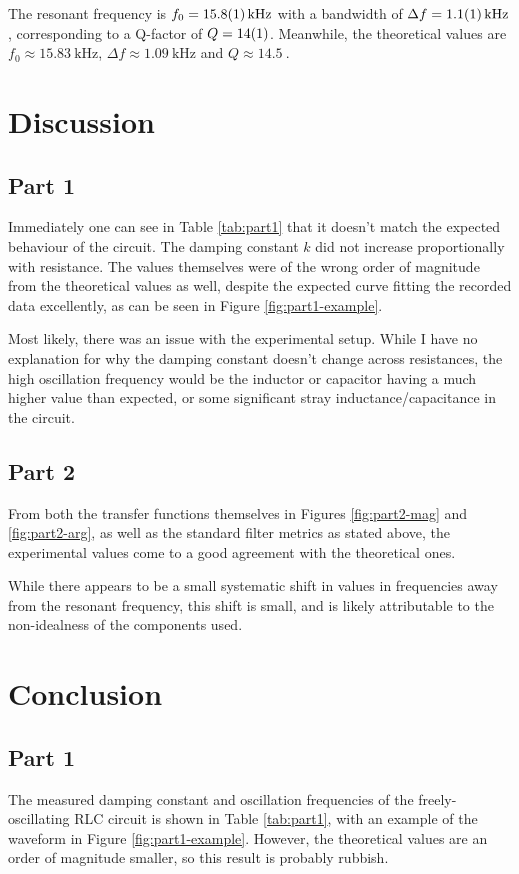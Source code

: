 \documentclass[a4paper]{scrartcl}
\begin{document}
The resonant frequency is \(f_0 = \SI{15.8 \pm 0.1}{\kilo\hertz}\) with a bandwidth of \(\Delta f = \SI{1.1 \pm 0.1}{\kilo\hertz}\), corresponding to a Q-factor of \(Q = \SI{14 \pm 1}{}\). Meanwhile, the theoretical values are \(f_0 \approx \SI{15.83}{\kilo\hertz}\), \(\Delta f \approx \SI{1.09}{\kilo\hertz}\) and \(Q \approx \SI{14.5}{}\).

\section{Discussion}
\subsection{Part 1}
Immediately one can see in Table \ref{tab:part1} that it doesn't match the expected behaviour of the circuit. The damping constant \(k\) did not increase proportionally with resistance. The values themselves were of the wrong order of magnitude from the theoretical values as well, despite the expected curve fitting the recorded data excellently, as can be seen in Figure \ref{fig:part1-example}.

Most likely, there was an issue with the experimental setup. While I have no explanation for why the damping constant doesn't change across resistances, the high oscillation frequency would be the inductor or capacitor having a much higher value than expected, or some significant stray inductance/capacitance in the circuit.

\subsection{Part 2}
From both the transfer functions themselves in Figures \ref{fig:part2-mag} and \ref{fig:part2-arg}, as well as the standard filter metrics as stated above, the experimental values come to a good agreement with the theoretical ones.

While there appears to be a small systematic shift in values in frequencies away from the resonant frequency, this shift is small, and is likely attributable to the non-idealness of the components used.

\section{Conclusion}
\subsection{Part 1}
The measured damping constant and oscillation frequencies of the freely-oscillating RLC circuit is shown in Table \ref{tab:part1}, with an example of the waveform in Figure \ref{fig:part1-example}. However, the theoretical values are an order of magnitude smaller, so this result is probably rubbish.
\end{document}

